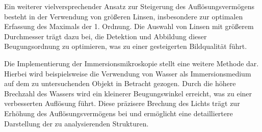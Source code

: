 Ein weiterer vielversprechender Ansatz zur Steigerung des Auflösungsvermögens besteht in der Verwendung von größeren Linsen, insbesondere zur optimalen Erfassung des Maximals der 1. Ordnung. Die Auswahl von Linsen mit größerem Durchmesser trägt dazu bei, die Detektion und Abbildung dieser Beugungsordnung zu optimieren, was zu einer gesteigerten Bildqualität führt.

Die Implementierung der Immersionsmikroskopie stellt eine weitere Methode dar. Hierbei wird beispielsweise die Verwendung von Wasser als Immersionsmedium auf dem zu untersuchenden Objekt in Betracht gezogen. Durch die höhere Brechzahl des Wassers wird ein kleinerer Beugungswinkel erreicht, was zu einer verbesserten Auflösung führt. Diese präzisere Brechung des Lichts trägt zur Erhöhung des Auflösungsvermögens bei und ermöglicht eine detailliertere Darstellung der zu analysierenden Strukturen.

